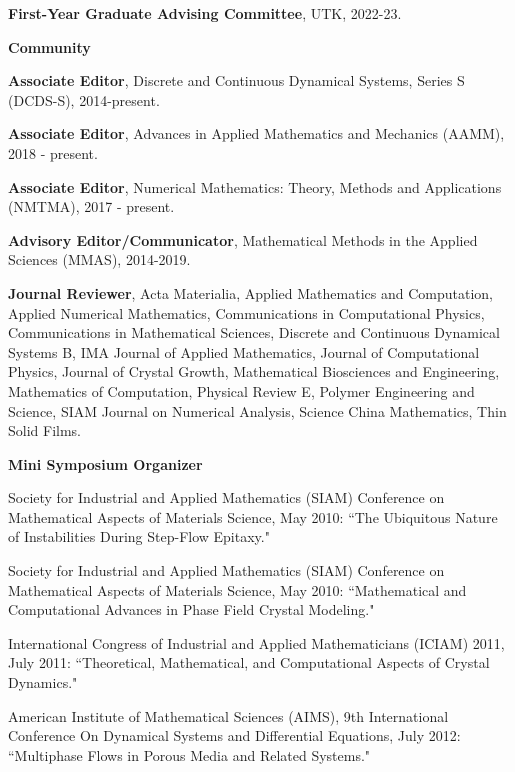 \documentclass[11pt]{letter}
\begin{document}
\begin{description}
\begin{description}
	\item
\textbf{First-Year Graduate Advising Committee}, UTK, 2022-23.


    \end{description}
    \item
{\Large\bf Community}
    \begin{description}
    \item
\textbf{Associate Editor},  Discrete and Continuous Dynamical Systems, Series S (DCDS-S), 2014-present.
	\item
\textbf{Associate Editor}, Advances in Applied Mathematics and Mechanics (AAMM), 2018 - present.
	\item
\textbf{Associate Editor}, Numerical Mathematics: Theory, Methods and Applications (NMTMA), 2017 - present.
    \item
\textbf{Advisory Editor/Communicator}, Mathematical Methods in the Applied Sciences (MMAS), 2014-2019.
    \item
\textbf{Journal Reviewer}, Acta Materialia, Applied Mathematics and Computation, Applied Numerical Mathematics, Communications in Computational Physics, Communications in Mathematical Sciences, Discrete and Continuous Dynamical Systems B, IMA Journal of Applied Mathematics, Journal of Computational Physics, Journal of Crystal Growth, Mathematical Biosciences and Engineering, Mathematics of Computation, Physical Review E, Polymer Engineering and Science, SIAM Journal on Numerical Analysis, Science China Mathematics, Thin Solid Films.
    \item
\textbf{Mini Symposium Organizer}
	\begin{description}
	\item
Society for Industrial and Applied Mathematics (SIAM) Conference on Mathematical Aspects of Materials Science, May 2010: ``The Ubiquitous Nature of Instabilities During Step-Flow Epitaxy."
    \item
Society for Industrial and Applied Mathematics (SIAM) Conference on Mathematical Aspects of Materials Science, May 2010: ``Mathematical and Computational Advances in Phase Field Crystal Modeling."
    \item
International Congress of Industrial and Applied Mathematicians (ICIAM) 2011, July 2011: ``Theoretical, Mathematical, and Computational Aspects of Crystal Dynamics."
	\item
American Institute of Mathematical Sciences (AIMS), 9th International Conference On Dynamical Systems and Differential Equations, July 2012: ``Multiphase Flows in Porous Media and Related Systems."

\end{description}
\end{description}
\end{description}
\end{document}
